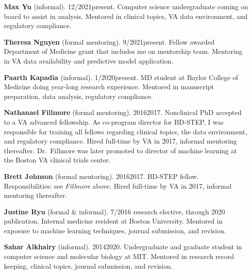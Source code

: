\documentclass[10pt]{article}
\begin{document}
\textbf{Max Yu} (informal). 12/2021\ndash{}present. Computer science
undergraduate coming on board to assist in analysis. Mentored in
clinical topics, VA data environment, and regulatory compliance.

\textbf{Theresa Nguyen} (formal mentoring). 9/2021\ndash{}present.
Fellow awarded Department of Medicine grant that includes me on
mentorship team. Mentoring in VA data availability and predictive
model application.

\textbf{Paarth Kapadia} (informal). 1/2020\ndash{}present. MD student
at Baylor College of Medicine doing year-long research experience.
Mentored in manuscript preparation, data analysis, regulatory
compliance.

\textbf{Nathanael Fillmore} (formal mentoring). 2016\ndash{}2017.
Nonclinical PhD accepted to a VA advanced fellowship. As co-program
director for BD-STEP, I was responsible for training all fellows
regarding clinical topics, the data environment, and regulatory
compliance. Hired full-time by VA in 2017, informal mentoring
thereafter. Dr.\ Fillmore was later promoted to director of machine
learning at the Boston VA clinical trials center.

\textbf{Brett Johnson} (formal mentoring). 2016\ndash{}2017. BD-STEP
fellow. Responsibilities: see \emph{Fillmore} above. Hired full-time
by VA in 2017, informal mentoring thereafter.

\textbf{Justine Ryu} (formal \& informal). 7/2016 research elective,
through 2020 publication. Internal medicine resident at Boston
University. Mentored in exposure to machine learning techniques,
journal submission, and revision.

\textbf{Sahar Alkhairy} (informal). 2014\ndash{}2020. Undergraduate
and graduate student in computer science and molecular biology at MIT.
Mentored in research record keeping, clinical topics, journal
submission, and revision.
\end{document}
